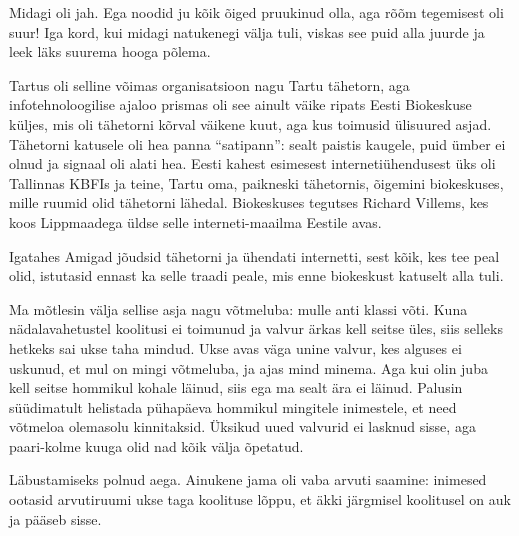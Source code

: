 
Midagi oli jah. Ega noodid ju kõik õiged pruukinud olla, aga rõõm tegemisest oli suur! Iga kord, kui midagi 
natukenegi välja tuli, viskas see puid alla juurde ja leek läks suurema hooga põlema.

Tartus oli selline võimas 
organisatsioon nagu Tartu 
tähetorn, aga infotehnoloogilise ajaloo prismas oli see ainult väike ripats Eesti 
Biokeskuse 
küljes, mis oli tähetorni kõrval väikene kuut, aga kus toimusid 
ülisuured asjad. Tähetorni katusele oli hea panna \enquote{satipann}: sealt paistis kaugele, puid ümber ei olnud ja
signaal oli alati hea. Eesti kahest
esimesest internetiühendusest üks oli Tallinnas KBFIs ja teine, Tartu oma, paikneski 
tähetornis, õigemini biokeskuses, mille ruumid olid tähetorni 
lähedal. Biokeskuses tegutses Richard Villems, kes koos Lippmaadega üldse selle interneti-maailma Eestile avas.

Igatahes Amigad jõudsid tähetorni ja ühendati internetti, sest kõik, kes tee peal olid, istutasid ennast ka selle traadi peale, mis enne biokeskust katuselt 
alla tuli. 


Ma mõtlesin välja sellise asja nagu võtmeluba: mulle anti klassi võti. Kuna nädalavahetustel koolitusi ei toimunud ja valvur ärkas kell seitse üles, 
siis selleks hetkeks sai ukse taha mindud. Ukse avas väga unine valvur, kes alguses ei uskunud, et mul on mingi võtmeluba, ja ajas mind minema. 
Aga kui olin juba kell seitse hommikul kohale läinud, siis ega ma sealt ära ei 
läinud. Palusin süüdimatult helistada pühapäeva hommikul mingitele inimestele, et need võtmeloa olemasolu kinnitaksid. Üksikud uued valvurid ei lasknud sisse, aga paari-kolme kuuga 
olid nad kõik välja õpetatud.


Läbustamiseks polnud aega. Ainukene jama oli vaba arvuti saamine: inimesed ootasid arvutiruumi ukse taga koolituse lõppu, et äkki järgmisel koolitusel on auk ja pääseb sisse. 

